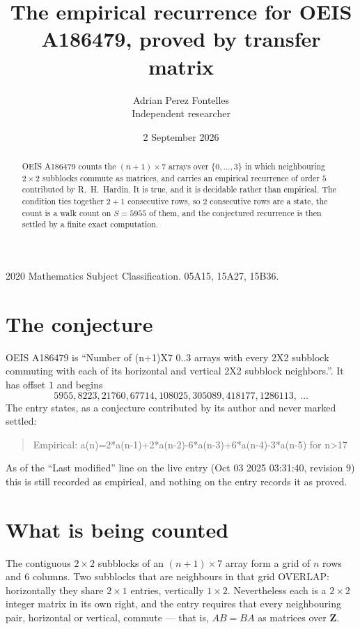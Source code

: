 \documentclass[11pt,a4paper]{article}
\title{The empirical recurrence for OEIS A186479, proved by transfer matrix}
\author{Adrian Perez Fontelles\\ \small Independent researcher}
\date{2 September 2026}
\theoremstyle{plain}
\theoremstyle{definition}
\begin{document}
\maketitle

\begin{abstract}
OEIS A186479 counts the $(n+1)\times7$ arrays over $\{0,\dots,3\}$ in which
neighbouring $2\times2$ subblocks commute as matrices, and carries an empirical
recurrence
of order $5$ contributed by R.~H.~Hardin. It is true, and it is decidable rather than
empirical. The condition ties together $2+1$ consecutive rows, so $2$ consecutive rows are
a state, the count is a walk count on $S=5955$ of them, and the conjectured recurrence is then
settled by a finite exact computation.
\end{abstract}

\noindent\small 2020 Mathematics Subject Classification. 05A15, 15A27, 15B36.\normalsize

\section{The conjecture}

OEIS A186479 is ``Number of (n+1)X7 0..3 arrays with every 2X2 subblock commuting with each of its horizontal and vertical 2X2 subblock neighbors.''. It has offset $1$ and begins
\[
5955, 8223, 21760, 67714, 108025, 305089, 418177, 1286113,\ \dots
\]
The entry states, as a conjecture contributed by its author and never marked settled:
\begin{quote}
Empirical: a(n)=2*a(n-1)+2*a(n-2)-6*a(n-3)+6*a(n-4)-3*a(n-5) for n>17
\end{quote}
As of the ``Last modified'' line on the live entry (Oct 03 2025 03:31:40, revision 9) this is still
recorded as empirical, and nothing on the entry records it as proved.

\section{What is being counted}

The contiguous $2\times2$ subblocks of an $(n+1)\times7$ array form a grid of $n$
rows and $6$ columns. Two subblocks that are neighbours in that
grid OVERLAP: horizontally they share $2\times1$ entries, vertically
$1\times2$. Nevertheless each is a $2\times2$ integer matrix in its own right, and
the entry requires that every neighbouring pair, horizontal or vertical, commute --- that is,
$AB=BA$ as matrices over $\mathbf{Z}$.
\end{document}
